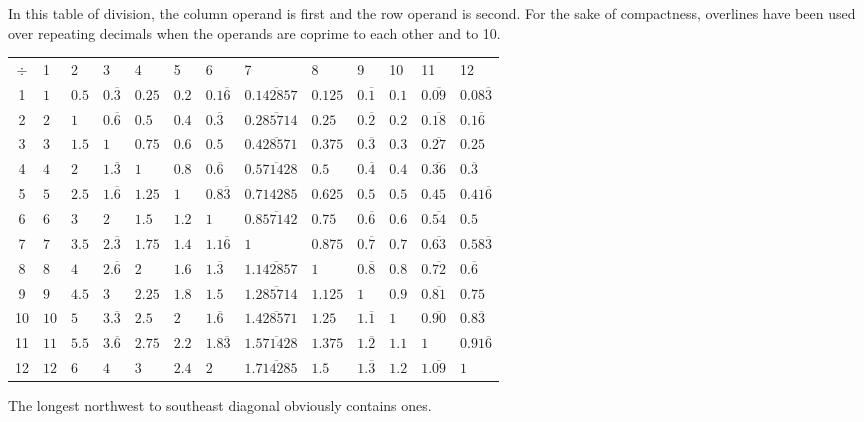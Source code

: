 \documentclass[12pt]{article}
\begin{document}
In this table of division, the column operand is first and the row operand is second. For the sake of compactness, overlines have been used over repeating decimals when the operands are coprime to each other and to 10.

\begin{tabular}{|c|l|l|l|l|l|l|l|l|l|l|l|l|}
$\div$ & 1 & 2 & 3 & 4 & 5 & 6 & 7 & 8 & 9 & 10 & 11 & 12 \\
1 & $1$ & $0.5$ & $0.\overline{3}$ & $0.25$ & $0.2$ & $0.1\overline{6}$ & $0.\overline{142857}$ & $0.125$ & $0.\overline{1}$ & $0.1$ & $0.\overline{09}$ & $0.08\overline{3}$ \\
2 & $2$ & $1$ & $0.\overline{6}$ & $0.5$ & $0.4$ & $0.\overline{3}$ & $0.\overline{285714}$ & $0.25$ & $0.\overline{2}$ & $0.2$ & $0.\overline{18}$ & $0.1\overline{6}$ \\
3 & $3$ & $1.5$ & $1$ & $0.75$ & $0.6$ & $0.5$ & $0.\overline{428571}$ & $0.375$ & $0.\overline{3}$ & $0.3$ & $0.\overline{27}$ & $0.25$ \\
4 & $4$ & $2$ & $1.\overline{3}$ & $1$ & $0.8$ & $0.\overline{6}$ & $0.\overline{571428}$ & $0.5$ & $0.\overline{4}$ & $0.4$ & $0.\overline{36}$ & $0.\overline{3}$ \\
5 & $5$ & $2.5$ & $1.\overline{6}$ & $1.25$ & $1$ & $0.8\overline{3}$ & $0.714285$ & $0.625$ & $0.5$ & $0.5$ & $0.45$ & $0.41\overline{6}$ \\
6 & $6$ & $3$ & $2$ & $1.5$ & $1.2$ & $1$ & $0.\overline{857142}$ & $0.75$ & $0.\overline{6}$ & $0.6$ & $0.\overline{54}$ & $0.5$ \\
7 & $7$ & $3.5$ & $2.\overline{3}$ & $1.75$ & $1.4$ & $1.1\overline{6}$ & $1$ & $0.875$ & $0.\overline{7}$ & $0.7$ & $0.\overline{63}$ & $0.58\overline{3}$ \\
8 & $8$ & $4$ & $2.\overline{6}$ & $2$ & $1.6$ & $1.\overline{3}$ & $1.\overline{142857}$ & $1$ & $0.\overline{8}$ & $0.8$ & $0.\overline{72}$ & $0.\overline{6}$ \\
9 & $9$ & $4.5$ & $3$ & $2.25$ & $1.8$ & $1.5$ & $1.\overline{285714}$ & $1.125$ & $1$ & $0.9$ & $0.\overline{81}$ & $0.75$ \\
10 & $10$ & $5$ & $3.\overline{3}$ & $2.5$ & $2$ & $1.\overline{6}$ & $1.\overline{428571}$ & $1.25$ & $1.\overline{1}$ & $1$ & $0.\overline{90}$ & $0.8\overline{3}$ \\
11 & $11$ & $5.5$ & $3.\overline{6}$ & $2.75$ & $2.2$ & $1.8\overline{3}$ & $1.\overline{571428}$ & $1.375$ & $1.\overline{2}$ & $1.1$ & $1$ & $0.91\overline{6}$ \\
12 & $12$ & $6$ & $4$ & $3$ & $2.4$ & $2$ & $1.\overline{714285}$ & $1.5$ & $1.\overline{3}$ & $1.2$ & $1.\overline{09}$ & $1$ \\
\end{tabular}

The longest northwest to southeast diagonal obviously contains ones.
\end{document}
